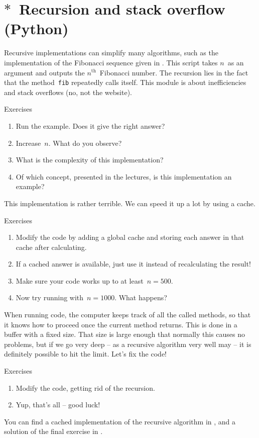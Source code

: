 \section{$\ast$~Recursion and stack overflow (Python)}

Recursive implementations can simplify many algorithms, such as the implementation of the Fibonacci sequence given in . This script takes $n$~as an argument and outputs the \ensuremath{n^{\text{th}}}~Fibonacci number. The recursion lies in the fact that the method~\texttt{fib} repeatedly calls itself. This module is about inefficiencies and stack overflows (no, not the website).
%
\begin{mybox}{Exercises}
    \begin{enumerate}
        \item Run the example. Does it give the right answer?
        \item Increase~$n$. What do you observe?
        \item What is the complexity of this implementation?
        \item Of which concept, presented in the lectures, is this implementation an example?
    \end{enumerate}
\end{mybox}

This implementation is rather terrible. We can speed it up a lot by using a cache.
%
\begin{mybox}{Exercises}
    \begin{enumerate}
        \item Modify the code by adding a global cache and storing each answer in that cache after calculating.
        \item If a cached answer is available, just use it instead of recalculating the result!
        \item Make sure your code works up to at least~$n = 500$.
        \item Now try running with~$n = 1000$. What happens?
    \end{enumerate}
\end{mybox}

When running code, the computer keeps track of all the called methods, so that it knows how to proceed once the current method returns. This is done in a buffer with a fixed size. That size is large enough that normally this causes no problems, but if we go very deep -- as a recursive algorithm very well may -- it is definitely possible to hit the limit. Let's fix the code!
%
\begin{mybox}{Exercises}
    \begin{enumerate}
        \item Modify the code, getting rid of the recursion. 
        \item Yup, that's all -- good luck!
    \end{enumerate}
\end{mybox}
%
You can find a cached implementation of the recursive algorithm in , and a solution of the final exercise in .

